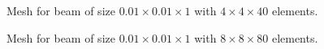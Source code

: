 \documentclass[a4paper, 12pt]{article}
\begin{document}
\begin{figure}[H]
  \centering
  \caption{Mesh for beam of size $0.01 \times 0.01\times 1$ with $4\times 4\times 40$ elements.}
\end{figure}

\begin{figure}[H]
  \centering
  \caption{Mesh for beam of size $0.01 \times 0.01\times 1$ with $8\times 8\times 80$ elements.}
\end{figure}
\end{document}
